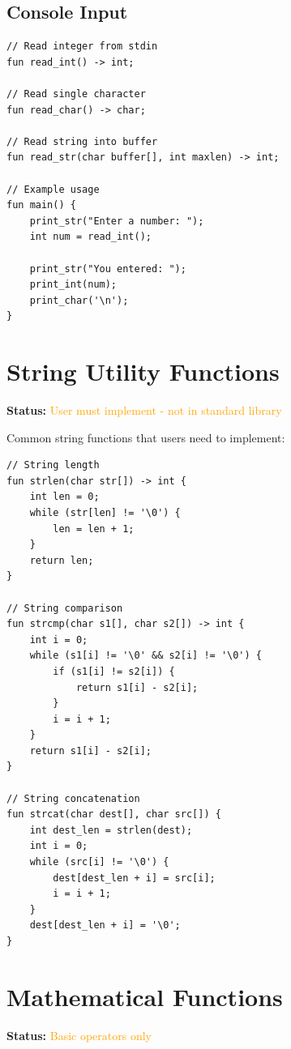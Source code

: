 \documentclass[12pt,a4paper,oneside]{book}
\begin{document}
\subsection{Console Input}

\begin{lstlisting}[style=algo, caption={Standard Input Functions}]
// Read integer from stdin
fun read_int() -> int;

// Read single character
fun read_char() -> char;

// Read string into buffer
fun read_str(char buffer[], int maxlen) -> int;

// Example usage
fun main() {
    print_str("Enter a number: ");
    int num = read_int();
    
    print_str("You entered: ");
    print_int(num);
    print_char('\n');
}
\end{lstlisting}

\section{String Utility Functions}

\textbf{Status:} \textcolor{orange}{User must implement - not in standard library}

Common string functions that users need to implement:

\begin{lstlisting}[style=algo, caption={User-Implemented String Functions}]
// String length
fun strlen(char str[]) -> int {
    int len = 0;
    while (str[len] != '\0') {
        len = len + 1;
    }
    return len;
}

// String comparison
fun strcmp(char s1[], char s2[]) -> int {
    int i = 0;
    while (s1[i] != '\0' && s2[i] != '\0') {
        if (s1[i] != s2[i]) {
            return s1[i] - s2[i];
        }
        i = i + 1;
    }
    return s1[i] - s2[i];
}

// String concatenation
fun strcat(char dest[], char src[]) {
    int dest_len = strlen(dest);
    int i = 0;
    while (src[i] != '\0') {
        dest[dest_len + i] = src[i];
        i = i + 1;
    }
    dest[dest_len + i] = '\0';
}
\end{lstlisting}

\section{Mathematical Functions}

\textbf{Status:} \textcolor{orange}{Basic operators only}
\end{document}
